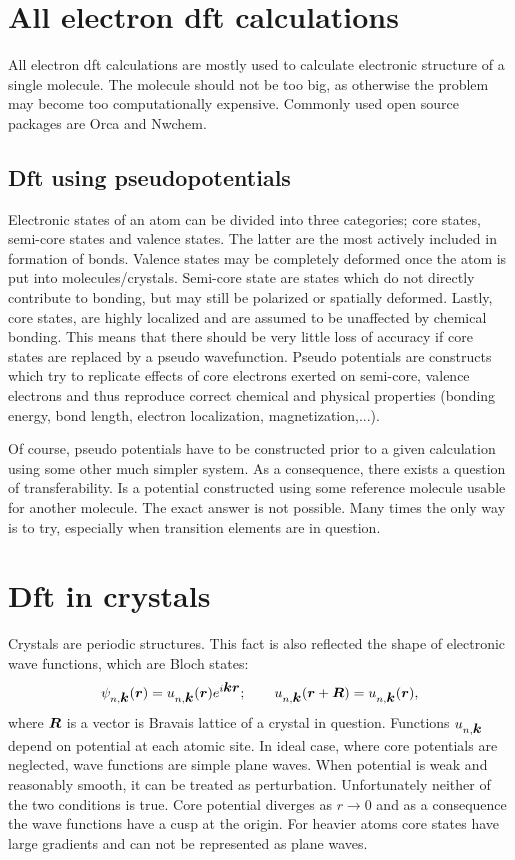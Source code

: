 \documentclass[openany, longbibliography,slovene,a4paper,12pt]{article}
\def\vec#1{\mbox{\boldmath$#1$}}
\begin{document}
\section{All electron dft calculations}
All electron dft calculations are mostly used to calculate electronic structure of
a single molecule. The molecule should not be too big, as otherwise the problem
may become too computationally expensive. Commonly used open source packages
are Orca and Nwchem.

\subsection{Dft using pseudopotentials}
Electronic states of an atom can be divided into three categories; core states,
semi-core states and valence states. The latter are the most actively included
in formation of bonds. Valence states may be completely deformed once the atom
is put into molecules/crystals. Semi-core state are states which do not
directly contribute to bonding, but may still be polarized or spatially
deformed. Lastly, core states, are highly localized and are assumed to be
unaffected by chemical bonding. This means that there should be very little loss
of accuracy if core states are replaced by a pseudo wavefunction.
Pseudo potentials are constructs which try to
replicate effects of core electrons exerted on semi-core, valence electrons and
thus reproduce correct chemical and physical properties (bonding energy, bond
length, electron localization, magnetization,...).

Of course, pseudo potentials have to be constructed prior to a given calculation using
some other much simpler system. As a consequence, there
exists a question of transferability. Is a potential constructed using some
reference molecule usable for another molecule. The exact answer is
not possible. Many times the only way is to try, especially when transition
elements are in question.


\section{Dft in crystals}
Crystals are periodic structures. This fact is also reflected the shape of
electronic  wave functions, which are Bloch states:
\begin{equation}
  \psi_{n, \vec k}(\vec r) = u_{n, \vec k}(\vec r)e^{i\vec k \vec r};\quad \textrm\quad u_{n,\vec k}(\vec r + \vec R) =  u_{n,\vec k}(\vec r),
\end{equation}
where $\vec R$ is a vector is Bravais lattice of a crystal in question.
Functions $u_{n,\vec k}$ depend on potential at each atomic site.
In ideal case, where core potentials are neglected,
wave functions are simple plane waves. When potential is weak and
reasonably smooth, it can be treated as perturbation. Unfortunately neither of
the two conditions is true. Core potential diverges as $r \rightarrow 0$
and as a consequence the wave functions have a cusp at the origin. For heavier
atoms core states have large gradients and can not be represented as plane waves.
\end{document}

